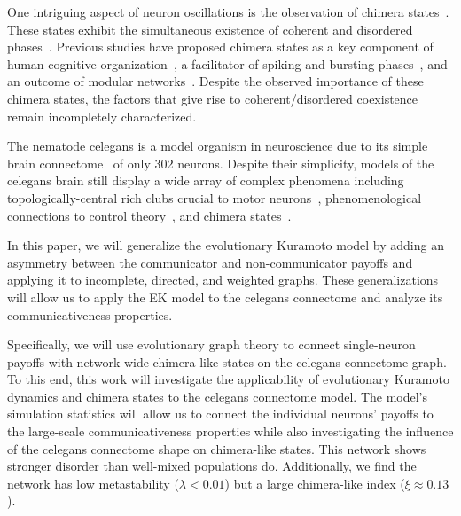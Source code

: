 \documentclass[pdflatex,lineno,referee,sn-nature]{sn-jnl}
\begin{document}
One intriguing aspect of neuron oscillations
is the observation of chimera states~\citep{majhi2019chimera}.
These states exhibit the simultaneous existence
of coherent and disordered phases~\citep{abrams2004chimera}.
Previous studies have proposed
chimera states as
a key component of human cognitive organization~\citep{bansal2019cognitive},
a facilitator of spiking and bursting phases~\citep{santos2017chimera},
and an outcome of modular networks~\citep{hizanidis2016chimera}.
Despite the observed importance of these chimera states,
the factors that give rise to coherent/disordered coexistence
remain incompletely characterized.

The nematode \gls{celegans}
is a model organism in neuroscience due to
its simple brain connectome~\citep{cook2019whole}
of only \num{302} neurons.
Despite their simplicity, models of the \gls{celegans} brain
still display a wide array of complex phenomena including
topologically-central rich clubs
crucial to motor neurons~\citep{towlson2013rich},
phenomenological connections to control theory~\citep{yan2017network},
and chimera states~\citep{hizanidis2016chimera}.

In this paper, we will generalize
the evolutionary Kuramoto model
by adding an asymmetry between
the communicator and non-communicator payoffs
and applying it to incomplete, directed, and weighted graphs.
These generalizations will allow us to apply the EK model
to the \gls{celegans} connectome
and analyze its communicativeness properties.

Specifically, we will use evolutionary graph theory to connect single-neuron payoffs
with network-wide chimera-like states on the \gls{celegans} connectome graph.
To this end, this work will investigate the applicability
of evolutionary Kuramoto dynamics and chimera states
to the \gls{celegans} connectome model.
The model's simulation statistics will allow us to connect
the individual neurons' payoffs to the large-scale communicativeness properties
while also investigating the influence of the \gls{celegans} connectome
shape on chimera-like states.
This network shows stronger disorder than well-mixed populations do.
Additionally, we find the network has low metastability ($\lambda < \num{0.01}$)
but a large chimera-like index ($\xi \approx \num{0.13}$).
\end{document}

